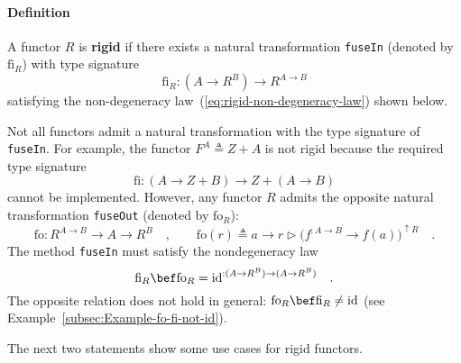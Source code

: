 \paragraph{Definition }

A functor $R$ is \textbf{rigid} if there exists
a natural transformation \lstinline!fuseIn! (denoted by $\text{fi}_{R}$)
with type signature
\[
\text{fi}_{R}:(A\rightarrow R^{B})\rightarrow R^{A\rightarrow B}
\]
satisfying the non-degeneracy law~(\ref{eq:rigid-non-degeneracy-law})
shown below.

Not all functors admit a natural transformation with the type signature
of \lstinline!fuseIn!. For example, the functor $F^{A}\triangleq Z+A$
is not rigid because the required type signature 
\[
\text{fi}:\left(A\rightarrow Z+B\right)\rightarrow Z+\left(A\rightarrow B\right)
\]
cannot be implemented. However, any functor $R$ admits the opposite
natural transformation \lstinline!fuseOut! (denoted by $\text{fo}_{R}$):
\begin{equation}
\text{fo}:R^{A\rightarrow B}\rightarrow A\rightarrow R^{B}\quad,\quad\quad\text{fo}\left(r\right)\triangleq a\rightarrow r\triangleright\big(f^{:A\rightarrow B}\rightarrow f\left(a\right)\big)^{\uparrow R}\quad.\label{eq:fuseOut-def}
\end{equation}
The method \lstinline!fuseIn! must satisfy the nondegeneracy law
\begin{equation}
\text{fi}_{R}\bef\text{fo}_{R}=\text{id}^{:(A\rightarrow R^{B})\rightarrow(A\rightarrow R^{B})}\quad.\label{eq:rigid-non-degeneracy-law}
\end{equation}
The opposite relation does not hold in general: $\text{fo}_{R}\bef\text{fi}_{R}\neq\text{id}$
(see Example~\ref{subsec:Example-fo-fi-not-id}).

The next two statements show some use cases for rigid functors. 

